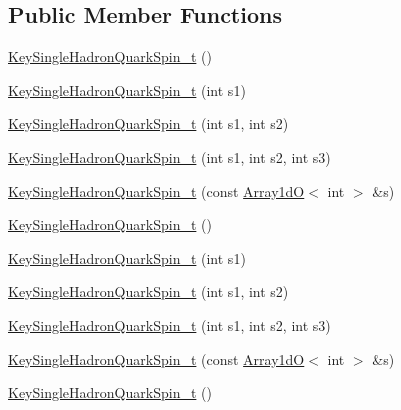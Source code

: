 \subsection*{Public Member Functions}
\begin{DoxyCompactItemize}
\item 
\mbox{\hyperlink{structHadron_1_1KeySingleHadronQuarkSpin__t_a5343b9bcb3637c3cbfd403c1fdcee16a}{Key\+Single\+Hadron\+Quark\+Spin\+\_\+t}} ()
\item 
\mbox{\hyperlink{structHadron_1_1KeySingleHadronQuarkSpin__t_adf80ea1775391ee8eb530185684343aa}{Key\+Single\+Hadron\+Quark\+Spin\+\_\+t}} (int s1)
\item 
\mbox{\hyperlink{structHadron_1_1KeySingleHadronQuarkSpin__t_a649d988b46181870449e3d527bb526e5}{Key\+Single\+Hadron\+Quark\+Spin\+\_\+t}} (int s1, int s2)
\item 
\mbox{\hyperlink{structHadron_1_1KeySingleHadronQuarkSpin__t_afec33cba311846572f37275a069d28af}{Key\+Single\+Hadron\+Quark\+Spin\+\_\+t}} (int s1, int s2, int s3)
\item 
\mbox{\hyperlink{structHadron_1_1KeySingleHadronQuarkSpin__t_afb7c4a9f15434b71a4782713c1e0339f}{Key\+Single\+Hadron\+Quark\+Spin\+\_\+t}} (const \mbox{\hyperlink{classADAT_1_1Array1dO}{Array1dO}}$<$ int $>$ \&s)
\item 
\mbox{\hyperlink{structHadron_1_1KeySingleHadronQuarkSpin__t_a5343b9bcb3637c3cbfd403c1fdcee16a}{Key\+Single\+Hadron\+Quark\+Spin\+\_\+t}} ()
\item 
\mbox{\hyperlink{structHadron_1_1KeySingleHadronQuarkSpin__t_adf80ea1775391ee8eb530185684343aa}{Key\+Single\+Hadron\+Quark\+Spin\+\_\+t}} (int s1)
\item 
\mbox{\hyperlink{structHadron_1_1KeySingleHadronQuarkSpin__t_a649d988b46181870449e3d527bb526e5}{Key\+Single\+Hadron\+Quark\+Spin\+\_\+t}} (int s1, int s2)
\item 
\mbox{\hyperlink{structHadron_1_1KeySingleHadronQuarkSpin__t_afec33cba311846572f37275a069d28af}{Key\+Single\+Hadron\+Quark\+Spin\+\_\+t}} (int s1, int s2, int s3)
\item 
\mbox{\hyperlink{structHadron_1_1KeySingleHadronQuarkSpin__t_afb7c4a9f15434b71a4782713c1e0339f}{Key\+Single\+Hadron\+Quark\+Spin\+\_\+t}} (const \mbox{\hyperlink{classADAT_1_1Array1dO}{Array1dO}}$<$ int $>$ \&s)
\item 
\mbox{\hyperlink{structHadron_1_1KeySingleHadronQuarkSpin__t_a5343b9bcb3637c3cbfd403c1fdcee16a}{Key\+Single\+Hadron\+Quark\+Spin\+\_\+t}} ()
\item 

\end{DoxyCompactItemize}
